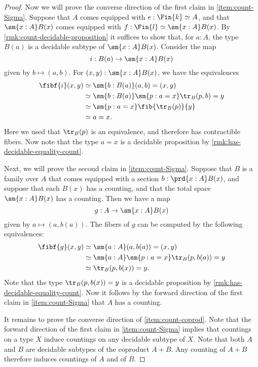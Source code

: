 \begin{proof}
  Now we will prove the converse direction of the first claim in \ref{item:count-Sigma}. Suppose that $A$ comes equipped with $e:\Fin{k}\simeq A$, and that $\sm{x:A}B(x)$ comes equipped with $f:\Fin{l}\simeq\sm{x:A}B(x)$. By \cref{rmk:count-decidable-proposition} it suffices to show that, for $a:A$, the type $B(a)$ is a decidable subtype of $\sm{x:A}B(x)$. Consider the map
  \begin{equation*}
    i: B(a)\to \sm{x:A}B(x)
  \end{equation*}
  given by $b\mapsto (a,b)$. For $(x,y):\sm{x:A}B(x)$, we have the equivalences
  \begin{align*}
    \fibf{i}(x,y) & \simeq \sm{b:B(a)}(a,b)=(x,y) \\
                  & \simeq \sm{b:B(a)}\sm{p:a=x}\tr_B(p,b)=y \\
                  & \simeq \sm{p:a=x}\fib{\tr_B(p)}{y} \\
                  & \simeq a=x.
  \end{align*}
  Here we used that $\tr_B(p)$ is an equivalence, and therefore has contractible fibers. Now note that the type $a=x$ is a decidable proposition by \cref{rmk:has-decidable-equality-count}.

  Next, we will prove the second claim in \ref{item:count-Sigma}. Suppose that $B$ is a family over $A$ that comes equipped with a section $b:\prd{x:A}B(x)$, and suppose that each $B(x)$ has a counting, and that the total space $\sm{x:A}B(x)$ has a counting. Then we have a map
  \begin{equation*}
    g : A\to\sm{x:A}B(x)
  \end{equation*}
  given by $a\mapsto (a,b(a))$. The fibers of $g$ can be computed by the following equivalences:
  \begin{align*}
    \fibf{g}(x,y) & \simeq \sm{a:A}(a,b(a))=(x,y) \\
                  & \simeq \sm{a:A}\sm{p:a=x}\tr_B(p,b(a))=y \\
    & \simeq \tr_B(p,b(x))=y.
  \end{align*}
  Note that the type $\tr_B(p,b(x))=y$ is a decidable proposition by \cref{rmk:has-decidable-equality-count}. Now it follows by the forward direction of the first claim in \ref{item:count-Sigma} that $A$ has a counting.

  It remains to prove the converse direction of \ref{item:count-coprod}. Note that the forward direction of the first claim in \ref{item:count-Sigma} implies that countings on a type $X$ induce countings on any decidable subtype of $X$. Note that both $A$ and $B$ are decidable subtypes of the coproduct $A+B$. Any counting of $A+B$ therefore induces countings of $A$ and of $B$.
\end{proof}

